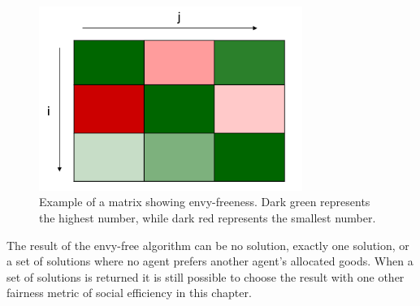 \documentclass[german, a4paper, 11pt, oneside]{scrbook}
\begin{document}
\begin{figure}[h]
\centering
\includegraphics[height=6cm]{envy_matrix}
\caption{Example of a matrix showing envy-freeness. Dark green represents the highest number, while dark red represents the smallest number.}
\end{figure}
The result of the envy-free algorithm can be no solution,  exactly one solution, or a set of solutions where no agent prefers another agent's allocated goods. When a set of solutions is returned it is still possible to choose the result with one other fairness metric of social efficiency in this chapter.
\end{document}
